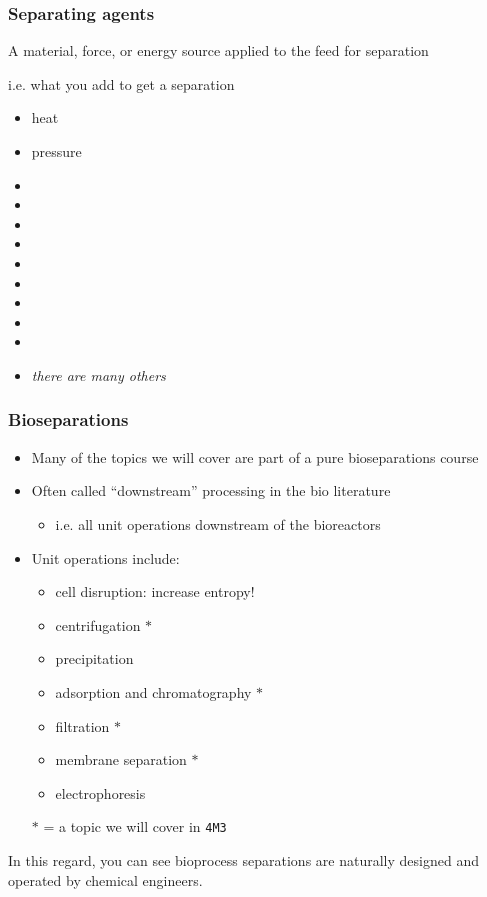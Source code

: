 \begin{frame}\frametitle{Separating agents}	
	\begin{exampleblock}
		{A material, force, or energy source applied to the feed for separation }
	\end{exampleblock}
	\vspace{12pt}
	i.e. what you add to get a separation
	\vspace{12pt}
	\begin{itemize}
		\item	heat
		\item	pressure
		\item	\iftoggle{instructor}{vacuum}{}
		\item	\iftoggle{instructor}{membrane}{}
		\item	\iftoggle{instructor}{filter media}{}
		\item	\iftoggle{instructor}{electric field}{}
		\item	\iftoggle{instructor}{flow}{}
		\item	\iftoggle{instructor}{temperature gradient}{}
		\item	\iftoggle{instructor}{concentration gradient}{}
		\item	\iftoggle{instructor}{gravitational field}{}
		\item	\iftoggle{instructor}{adsorbent}{}
		\item	\emph{there are many others}
	\end{itemize}
\end{frame}

\begin{frame}\frametitle{Bioseparations}	
	\begin{itemize}
		\item	Many of the topics we will cover are part of a pure bioseparations course
		\item	Often called ``downstream'' processing in the bio literature
		\begin{itemize}
			\item	i.e. all unit operations downstream of the bioreactors
		\end{itemize}
		\item	Unit operations include:
		\begin{itemize}
			\item	cell disruption: increase entropy!
			\item	centrifugation $\ast$
			\item	precipitation
			\item	adsorption and chromatography $\ast$
			\item	filtration $\ast$
			\item	membrane separation $\ast$
			\item	electrophoresis
		\end{itemize}
		\vspace{12pt}
		$\ast$ = a topic we will cover in \texttt{4M3}
	\end{itemize}
	\vspace{12pt}
	In this regard, you can see bioprocess separations are naturally designed and operated by chemical engineers.
\end{frame}

